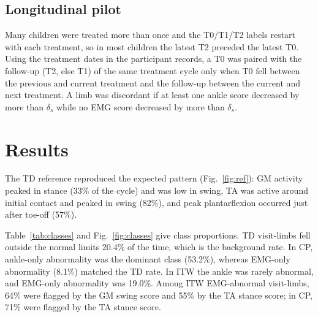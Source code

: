 \documentclass[conference]{IEEEtran}
\begin{document}
\subsection{Longitudinal pilot}
Many children were treated more than once and the T0/T1/T2 labels restart with each treatment, so in most children the latest T2 preceded the latest T0. Using the treatment dates in the participant records, a T0 was paired with the follow-up (T2, else T1) of the same treatment cycle only when T0 fell between the previous and current treatment and the follow-up between the current and next treatment. A limb was discordant if at least one ankle score decreased by more than $\delta_s$ while no EMG score decreased by more than $\delta_s$.

\section{Results}
The TD reference reproduced the expected pattern (Fig.~\ref{fig:ref}): GM activity peaked in stance (33\% of the cycle) and was low in swing, TA was active around initial contact and peaked in swing (82\%), and peak plantarflexion occurred just after toe-off (57\%).


Table~\ref{tab:classes} and Fig.~\ref{fig:classes} give class proportions. TD visit-limbs fell outside the normal limits 20.4\% of the time, which is the background rate. In CP, ankle-only abnormality was the dominant class (53.2\%), whereas EMG-only abnormality (8.1\%) matched the TD rate. In ITW the ankle was rarely abnormal, and EMG-only abnormality was 19.0\%. Among ITW EMG-abnormal visit-limbs, 64\% were flagged by the GM swing score and 55\% by the TA stance score; in CP, 71\% were flagged by the TA stance score.

\begin{table}[t]
\centering
\caption{Concordance classes (\% of visit-limbs, 95\% child-bootstrap CI). $n$: visit-limbs/children; Std.: score exceeds $U_s$; Rob.: exceeds $U_s+\delta_s$}
\label{tab:classes}
\scriptsize
\setlength{\tabcolsep}{2.2pt}
\end{table}
\end{document}
